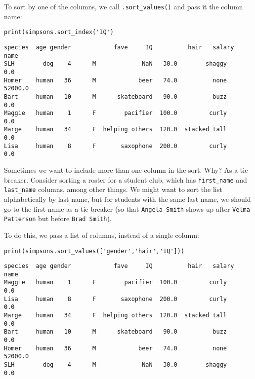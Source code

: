 To sort by one of the columns, we call \texttt{.sort\_values()} and pass it the
column name:

\begin{Verbatim}[fontsize=\small,samepage=true,frame=single,framesep=3mm]
print(simpsons.sort_index('IQ')
\end{Verbatim}
\vspace{-.2in}

\begin{Verbatim}[fontsize=\scriptsize,samepage=true,frame=leftline,framesep=5mm,framerule=1mm]
       species  age gender            fave     IQ          hair   salary
name                                                                    
SLH        dog    4      M             NaN   30.0        shaggy      0.0
Homer    human   36      M            beer   74.0          none  52000.0
Bart     human   10      M      skateboard   90.0          buzz      0.0
Maggie   human    1      F        pacifier  100.0         curly      0.0
Marge    human   34      F  helping others  120.0  stacked tall      0.0
Lisa     human    8      F       saxophone  200.0         curly      0.0
\end{Verbatim}


Sometimes we want to include more than one column in the sort. Why? As a
tie-breaker. Consider sorting a roster for a student club, which has
\texttt{first\_name} and \texttt{last\_name} columns, among other things. We
might want to sort the list alphabetically by last name, but for students with
the same last name, we should go to the first name as a tie-breaker (so that
\texttt{Angela Smith} shows up after \texttt{Velma Patterson} but before
\texttt{Brad Smith}).

To do this, we pass a list of columns, instead of a single column:

\begin{samepage}
\begin{Verbatim}[fontsize=\small,samepage=true,frame=single,framesep=3mm]
print(simpsons.sort_values(['gender','hair','IQ']))
\end{Verbatim}
\vspace{-.2in}

\begin{Verbatim}[fontsize=\scriptsize,samepage=true,frame=leftline,framesep=5mm,framerule=1mm]
       species  age gender            fave     IQ          hair   salary
name                                                                    
Maggie   human    1      F        pacifier  100.0         curly      0.0
Lisa     human    8      F       saxophone  200.0         curly      0.0
Marge    human   34      F  helping others  120.0  stacked tall      0.0
Bart     human   10      M      skateboard   90.0          buzz      0.0
Homer    human   36      M            beer   74.0          none  52000.0
SLH        dog    4      M             NaN   30.0        shaggy      0.0
\end{Verbatim}
\end{samepage}

